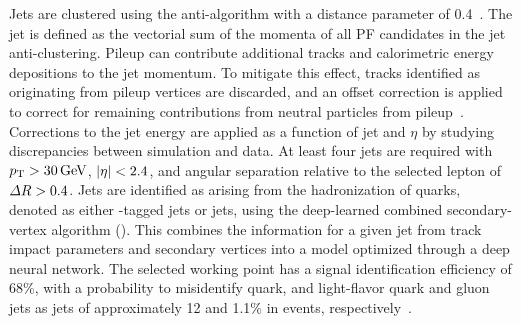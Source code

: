 Jets are clustered using the anti-\kt algorithm with a distance parameter of 0.4~\cite{CMS:fastjet, CMS:antikt}.
The jet \ptvec is defined as the vectorial sum of the momenta of all PF candidates in the jet anti-\kt clustering.
Pileup can contribute additional tracks and calorimetric energy depositions to the jet momentum.
To mitigate this effect, tracks identified as originating from pileup vertices are discarded, and an offset correction is applied to correct for remaining contributions from neutral particles from pileup~\cite{CMS:particle_flow}.
Corrections to the jet energy are applied as a function of jet \PT and $\eta$ by studying discrepancies between simulation and data.
At least four jets are required with $p_{\mathrm{T}} > 30\,\text{Ge\hspace{-.08em}V}$, $\lvert \eta \rvert < 2.4$, and angular separation relative to the selected lepton of $\Delta R > 0.4$.
Jets are identified as arising from the hadronization of \PQb quarks, denoted as either \PQb-tagged jets or \PQb jets, using the deep-learned combined secondary-vertex algorithm (\DeepCSV).
This combines the information for a given jet from track impact parameters and secondary vertices into a model optimized through a deep neural network.
The selected working point has a signal identification efficiency of 68\%, with a probability to misidentify \PQc quark, and light-flavor quark and gluon jets as \PQb jets of approximately 12 and 1.1\% in \ttbar events, respectively~\cite{CMS:bjet_eff}.

